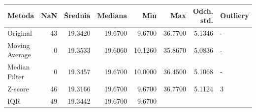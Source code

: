\documentclass[12pt,twoside]{article}
\begin{document}
	\begin{table}
    \centering
    \begin{tabular}{|l|r|r|r|r|r|r|l|}
        \toprule
        \textbf{Metoda} & \textbf{NaN} & \textbf{Średnia} & \textbf{Mediana} & \textbf{Min} & \textbf{Max} & \textbf{Odch. std.} & \textbf{Outliery} \\
        \midrule
				Original
			 &
				43
			 &
				19.3420
			 &
				19.6700
			 &
				9.6700
			 &
				36.7700
			 &
				5.1346
			 &
				-
			 \\

				Moving
				Average


			 &
				0


			 &
				19.3533


			 &
				19.6060


			 &
				10.1260


			 &
				35.8670


			 &
				5.0836


			 &
				-


			 \\

				Median
				Filter


			 &
				0


			 &
				19.3457


			 &
				19.6700


			 &
				10.0000


			 &
				36.4500


			 &
				5.1068


			 &
				-


			 \\

				Z-score


			 &
				46


			 &
				19.3166


			 &
				19.6700


			 &
				9.6700


			 &
				36.7700


			 &
				5.1124


			 &
				3


			 \\

				IQR


			 &
				49


			 &
				19.3442


			 &
				19.6700


			 &
				9.6700



\end{tabular}
\end{table}
\end{document}

